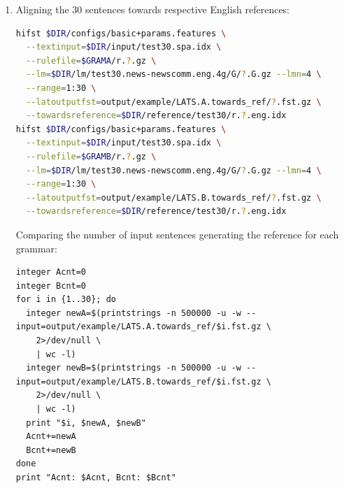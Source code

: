 \documentclass[a4paper,oneside,reqno]{amsart}
\begin{document}
\begin{enumerate}[label=\arabic*.]
  \item Aligning the 30 sentences towards respective English references:
    \begin{lstlisting}[language=bash]
hifst $DIR/configs/basic+params.features \
  --textinput=$DIR/input/test30.spa.idx \
  --rulefile=$GRAMA/r.?.gz \
  --lm=$DIR/lm/test30.news-newscomm.eng.4g/G/?.G.gz --lmn=4 \
  --range=1:30 \
  --latoutputfst=output/example/LATS.A.towards_ref/?.fst.gz \
  --towardsreference=$DIR/reference/test30/r.?.eng.idx
hifst $DIR/configs/basic+params.features \
  --textinput=$DIR/input/test30.spa.idx \
  --rulefile=$GRAMB/r.?.gz \
  --lm=$DIR/lm/test30.news-newscomm.eng.4g/G/?.G.gz --lmn=4 \
  --range=1:30 \
  --latoutputfst=output/example/LATS.B.towards_ref/?.fst.gz \
  --towardsreference=$DIR/reference/test30/r.?.eng.idx
    \end{lstlisting}
    Comparing the number of input sentences generating the reference for each
    grammar:

    \begin{lstlisting}
integer Acnt=0
integer Bcnt=0
for i in {1..30}; do
  integer newA=$(printstrings -n 500000 -u -w --input=output/example/LATS.A.towards_ref/$i.fst.gz \
    2>/dev/null \
    | wc -l)
  integer newB=$(printstrings -n 500000 -u -w --input=output/example/LATS.B.towards_ref/$i.fst.gz \
    2>/dev/null \
    | wc -l)
  print "$i, $newA, $newB"
  Acnt+=newA
  Bcnt+=newB
done
print "Acnt: $Acnt, Bcnt: $Bcnt"
    \end{lstlisting}


\end{enumerate}
\end{document}
